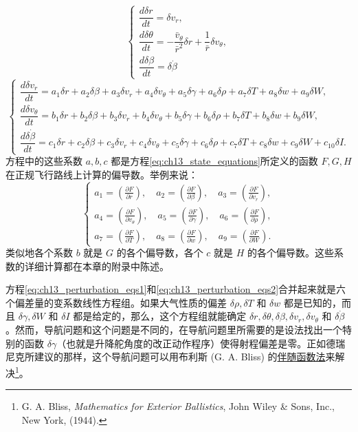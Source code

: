 \begin{equation}\label{eq:ch13_perturbation_eqs1}
\begin{cases}
\dfrac{d\delta r}{dt} = \delta v_r,\\[6pt]
\dfrac{d\delta \theta}{dt} = -\dfrac{\bar{v}_\theta}{\bar{r}^2} \delta r + \dfrac{1}{\bar{r}} \delta v_\theta,\\[6pt]
\dfrac{d\delta \beta}{dt} = \delta \dot{\beta}
\end{cases}
\end{equation}
\begin{equation}\label{eq:ch13_perturbation_eqs2}
\begin{cases}
\dfrac{d\delta v_r}{dt} = a_1 \delta r + a_2 \delta \beta + a_3 \delta v_r + a_4 \delta v_\theta + a_5 \delta \gamma + a_6 \delta \rho + a_7 \delta T + a_8 \delta w + a_9 \delta W,\\[6pt]
\dfrac{d\delta v_\theta}{dt} = b_1 \delta r + b_2 \delta \beta + b_3 \delta v_r + b_4 \delta v_\theta + b_5 \delta \gamma + b_6 \delta \rho + b_7 \delta T + b_8 \delta w + b_9 \delta W,\\[6pt]
\dfrac{d\delta \dot{\beta}}{dt} = c_1 \delta r + c_2 \delta \beta + c_3 \delta v_r + c_4 \delta v_\theta + c_5 \delta \gamma + c_6 \delta \rho + c_7 \delta T + c_8 \delta w + c_9 \delta W + c_{10} \delta I.
\end{cases}
\end{equation}
方程中的这些系数 $a, b, c$ 都是方程\eqref{eq:ch13_state_equations}所定义的函数 $F, G, H$ 在正规飞行路线上计算的偏导数。举例来说：
\begin{equation}
\begin{cases}
a_1 = \left( \frac{\partial F}{\partial r} \right), \quad a_2 = \left( \frac{\partial F}{\partial \beta} \right), \quad a_3 = \left( \frac{\partial F}{\partial v_r} \right),\\
a_4 = \left( \frac{\partial F}{\partial v_\theta} \right), \quad a_5 = \left( \frac{\partial F}{\partial \gamma} \right), \quad a_6 = \left( \frac{\partial F}{\partial \rho} \right),\\
a_7 = \left( \frac{\partial F}{\partial T} \right), \quad a_8 = \left( \frac{\partial F}{\partial w} \right), \quad a_9 = \left( \frac{\partial F}{\partial W} \right).
\end{cases}
\end{equation}
类似地各个系数 $b$ 就是 $G$ 的各个偏导数，各个 $c$ 就是 $H$ 的各个偏导数。这些系数的详细计算都在本章的附录中陈述。

方程\eqref{eq:ch13_perturbation_eqs1}和\eqref{eq:ch13_perturbation_eqs2}合并起来就是六个偏差量的变系数线性方程组。如果大气性质的偏差 $\delta \rho, \delta T$ 和 $\delta w$ 都是已知的，而且 $\delta \gamma, \delta W$ 和 $\delta I$ 都是给定的，那么，这个方程组就能确定 $\delta r, \delta \theta, \delta \beta, \delta v_r, \delta v_\theta$ 和 $\delta \dot{\beta}$。然而，导航问题和这个问题是不同的，在导航问题里所需要的是设法找出一个特别的函数 $\delta \gamma$（也就是升降舵角度的改正动作程序）使得射程偏差是零。正如德瑞尼克所建议的那样，这个导航问题可以用布利斯 (G. A. Bliss) 的\underline{伴随函数法}来解决\footnote{G. A. Bliss, \textit{Mathematics for Exterior Ballistics}, John Wiley \& Sons, Inc., New York, (1944).}。


